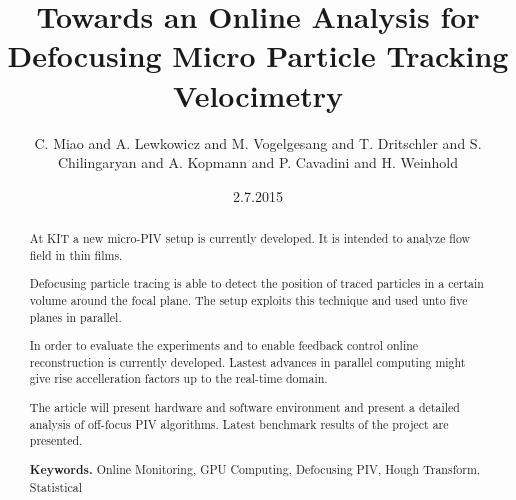 \documentclass[11pt]{amsart}
\title{Towards an Online Analysis for Defocusing Micro Particle Tracking Velocimetry}
\author{C. Miao and A. Lewkowicz and M. Vogelgesang and T. Dritschler and S. Chilingaryan and A. Kopmann and P. Cavadini and H. Weinhold}
\date{2.7.2015}                     %
\begin{document}
\maketitle

\begin{abstract}

At KIT a new micro-PIV setup is currently developed.  It is intended to analyze
flow field in thin films. 

Defocusing particle tracing is able to detect the position of traced particles
in a certain volume around the focal plane. The setup exploits this technique
and used unto five planes in parallel. 

In order to evaluate the experiments and to enable feedback control online
reconstruction is currently developed. Lastest advances in parallel computing
might give rise accelleration factors up to the real-time domain. 

The article will present hardware and software environment and present a
detailed analysis of off-focus PIV algorithms. Latest benchmark results of the
project are presented.

\smallskip
\noindent \textbf{Keywords.} Online Monitoring, GPU Computing, Defocusing PIV, 
Hough Transform, Statistical
\end{abstract}



\end{document}
